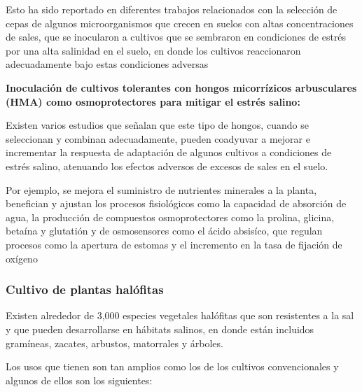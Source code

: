 Esto ha sido reportado en diferentes trabajos relacionados con la selección de cepas de algunos microorganismos que crecen en suelos con altas concentraciones de sales, que se inocularon a cultivos que se sembraron en condiciones de estrés por una alta salinidad en el suelo, en donde los cultivos reaccionaron adecuadamente bajo estas condiciones adversas

\textbf{Inoculación de cultivos tolerantes con hongos micorrízicos arbusculares (HMA) como osmoprotectores para mitigar el estrés salino:}

Existen varios estudios que señalan que este tipo de hongos, cuando se seleccionan y combinan adecuadamente, pueden coadyuvar a mejorar e incrementar la respuesta de adaptación de algunos cultivos a condiciones de estrés salino, atenuando los efectos adversos de excesos de sales en el suelo.

Por ejemplo, se mejora el suministro de nutrientes minerales a la planta, benefician y ajustan los procesos fisiológicos como la capacidad de absorción de agua, la producción de compuestos osmoprotectores como la prolina, glicina, betaína y glutatión y de osmosensores como el ácido absisíco, que regulan procesos como la apertura de estomas y el incremento en la tasa de fijación de oxígeno

\subsubsection{Cultivo de plantas halófitas}
Existen alrededor de 3,000 especies vegetales halófitas que son resistentes a la sal y que pueden desarrollarse en hábitats salinos, en donde están incluidos gramíneas, zacates, arbustos, matorrales y árboles.

Los usos que tienen son tan amplios como los de los cultivos convencionales y algunos de ellos son los siguientes:

